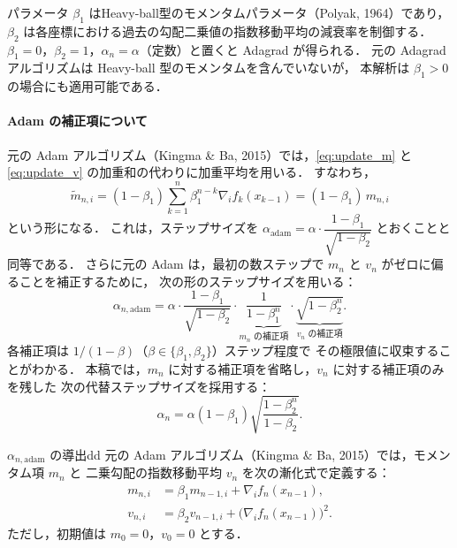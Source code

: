\documentclass[dvipdfmx,a4paper,11pt]{jsarticle}
\begin{document}
パラメータ $\beta_1$ はHeavy-ball型のモメンタムパラメータ（Polyak, 1964）であり，
$\beta_2$ は各座標における過去の勾配二乗値の指数移動平均の減衰率を制御する．
$\beta_1 = 0$，$\beta_2 = 1$，$\alpha_n = \alpha$（定数）と置くと Adagrad が得られる．
元の Adagrad アルゴリズムは Heavy-ball 型のモメンタムを含んでいないが，
本解析は $\beta_1 > 0$ の場合にも適用可能である．

\paragraph{Adam の補正項について}
元の Adam アルゴリズム（Kingma \& Ba, 2015）では，\eqref{eq:update_m} と
\eqref{eq:update_v} の加重和の代わりに加重平均を用いる．
すなわち，
\begin{equation}
    \tilde{m}_{n,i}
    = (1-\beta_1)\sum_{k=1}^{n} \beta_1^{n-k} \nabla_i f_k(x_{k-1})
    = (1-\beta_1)\, m_{n,i}
\end{equation}
という形になる．
これは，ステップサイズを $\alpha_{\mathrm{adam}} = \alpha \cdot \dfrac{1-\beta_1}{\sqrt{1-\beta_2}}$ 
とおくことと同等である．
さらに元の Adam は，最初の数ステップで $m_n$ と $v_n$ がゼロに偏ることを補正するために，
次の形のステップサイズを用いる：
\begin{equation}
    \alpha_{n,\mathrm{adam}}
    = \alpha \cdot \frac{1-\beta_1}{\sqrt{1-\beta_2}}
    \cdot \underbrace{\frac{1}{1-\beta_1^n}}_{\text{$m_n$ の補正項}}
    \cdot \underbrace{\sqrt{1-\beta_2^n}}_{\text{$v_n$ の補正項}}.
    \label{eq:adam_step}
\end{equation}
各補正項は $1/(1-\beta)$（$\beta \in \{\beta_1, \beta_2\}$）ステップ程度で
その極限値に収束することがわかる．
本稿では，$m_n$ に対する補正項を省略し，$v_n$ に対する補正項のみを残した
次の代替ステップサイズを採用する：
\begin{equation}
    \alpha_n = \alpha(1-\beta_1)\sqrt{\frac{1-\beta_2^n}{1-\beta_2}}.
    \label{eq:step_size}
\end{equation}


\begin{reidai}{$\alpha_{n,\mathrm{adam}}$ の導出}{dd}
元の Adam アルゴリズム（Kingma \& Ba, 2015）では，モメンタム項 $m_n$ と
二乗勾配の指数移動平均 $v_n$ を次の漸化式で定義する：
\begin{align}
    m_{n,i} &= \beta_1 m_{n-1,i} + \nabla_i f_n(x_{n-1}), \label{eq:m_raw}\\
    v_{n,i} &= \beta_2 v_{n-1,i} + \bigl(\nabla_i f_n(x_{n-1})\bigr)^2. \label{eq:v_raw}
\end{align}
ただし，初期値は $m_0 = 0$，$v_0 = 0$ とする．
\end{reidai}
\end{document}
